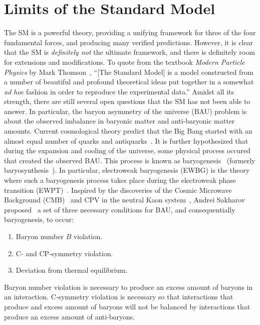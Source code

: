 \section{Limits of the Standard Model}
The SM is a powerful theory, providing a unifying framework for three of the four fundamental forces, and producing many verified predictions.
However, it is clear that the SM is \textit{definitely not} the ultimate framework, and there is definitely room for extensions and modifications.
To quote from the textbook \textit{Modern Particle Physics} by Mark Thomson~\cite{Thomson2013ParticleTextbook},
``[The Standard Model] is a model constructed from a number of beautiful and profound theoretical ideas
put together in a somewhat \textit{ad hoc} fashion in order to reproduce the experimental data.''
Amidst all its strength, there are still several open questions that the SM has not been able to answer.
In particular, the baryon asymmetry of the universe (BAU) problem is about the observed imbalance in baryonic matter and anti-baryonic matter amounts.
Current cosmological theory predict that the Big Bang started with an almost equal number of quarks and antiquarks~\cite{Sarkar2008AstroparticlePhysics}.
It is further hypothesized that during the expansion and cooling of the universe, some physical process occured that created the observed BAU.
This process is known as baryogenesis~\cite{Liddle2015Cosmology} (formerly baryosynthesis~\cite{BarrowTurner1981Baryosynthesis,Turner1981GUT}).
In particular, electroweak baryogenesis (EWBG) is the theory where such a baryogenesis process takes place during the electroweak phase transition (EWPT)~\cite{Kuzmin1985EWBG, Cohen1990EWBG}.
Inspired by the discoveries of the Cosmic Microwave Background (CMB)~\cite{PenziasWilson1965CMB} and CPV in the neutral Kaon system~\cite{CroninFitch1964KaonCPV},
Andrei Sakharov proposed~\cite{Sakharov1967BAU} a set of three necessary conditions for BAU, and consequentially baryogenesis, to occur:
\begin{enumerate}
  \item Baryon number \(B \) violation.
  \item C- and CP-symmetry violation.
  \item Deviation from thermal equilibrium.
\end{enumerate}
Baryon number violation is necessary to produce an excess amount of baryons in an interaction.
C-symmetry violation is necessary so that interactions that produce and excess amount of baryons will not be balanced by interactions that produce an excess amount of anti-baryons.
